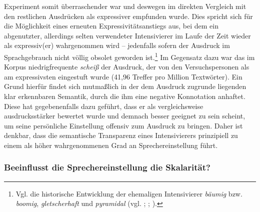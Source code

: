 Experiment somit überraschender war und deswegen im direkten Vergleich mit den restlichen Ausdrücken als expressiver empfunden wurde. Dies spricht sich für die Möglichkeit eines erneuten Expressivitätsanstiegs aus, bei dem ein abgenutzter, allerdings selten verwendeter Intensivierer im Laufe der Zeit wieder als expressiv(er) wahrgenommen wird -- jedenfalls sofern der Ausdruck im Sprachgebrauch nicht völlig obsolet geworden ist.\footnote{Vgl. die historische Entwicklung der ehemaligen Intensivierer \textit{bäumig}  bzw. \textit{boomig}, \textit{gletscherhaft} und \textit{pyramidal} (vgl. \citealt[135]{Tobler.1868}; {\citealt[7f.]{Mueller.1899}}; {\citealt[268]{Becher.1907}}).} Im Gegensatz dazu war das im Korpus niedrigfrequente \textit{scheiß} der Ausdruck, der von den Versuchspersonen als am expressivsten eingestuft wurde (41,96 Treffer pro Million Textwörter). Ein Grund hierfür findet sich mutmaßlich in der dem Ausdruck zugrunde liegenden klar erkennbaren Semantik, durch die ihm eine negative Konnotation anhaftet. Diese hat gegebenenfalls dazu geführt, dass er als vergleichsweise ausdrucksstärker bewertet wurde und demnach besser geeignet zu sein scheint, um seine persönliche Einstellung offensiv zum Ausdruck zu bringen. Daher ist denkbar, dass die semantische Transparenz eines Intensivierers prinzipiell zu einem als höher wahrgenommenen Grad an Sprechereinstellung führt.





\subsubsection[Einfluss von Sprechereinstellung auf Skalarität]{Beeinflusst die Sprechereinstellung die Skalarität?}


